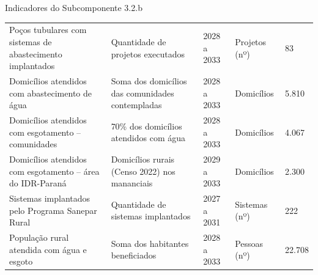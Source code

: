 \begin{quadro}[htbp]
\caption{Indicadores do Subcomponente 3.2.b}
\label{qua:indicadores}
\footnotesize
\renewcommand{\arraystretch}{1.25}
\begin{tabularx}{\textwidth}{|L|L|Q{1.6cm}|P{2.2cm}|Q{1.4cm}|}
\hline
{} &  &  &
 &  \\ \hline
Poços tubulares com sistemas de abastecimento implantados &
Quantidade de projetos executados & 2028 a 2033 & Projetos (nº) & 83 \\ \hline
Domicílios atendidos com abastecimento de água &
Soma dos domicílios das comunidades contempladas & 2028 a 2033 & Domicílios & 5.810 \\ \hline
Domicílios atendidos com esgotamento -- comunidades &
70\% dos domicílios atendidos com água & 2028 a 2033 & Domicílios & 4.067 \\ \hline
Domicílios atendidos com esgotamento -- área do IDR-Paraná &
Domicílios rurais (Censo 2022) nos mananciais & 2029 a 2033 & Domicílios & 2.300 \\ \hline
Sistemas implantados pelo Programa Sanepar Rural &
Quantidade de sistemas implantados & 2027 a 2031 & Sistemas (nº) & 222 \\ \hline
População rural atendida com água e esgoto &
Soma dos habitantes beneficiados & 2028 a 2033 & Pessoas (nº) & 22.708 \\ \hline
\end{tabularx}
\end{quadro}

